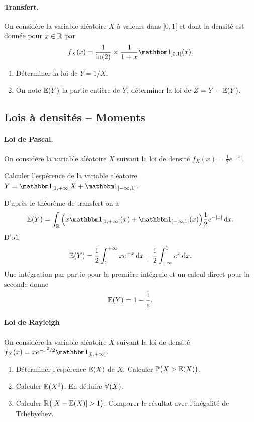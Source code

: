 \documentclass[11pt, a4paper]{article}
\begin{document}
\paragraph{Transfert.} On considère la variable aléatoire $X$ à valeurs
dans $]0, 1[$ et dont la densité est donnée pour $x \in \mathbb{R}$ par
\[
f_X(x) = \frac{1}{\ln(2)}\times \frac{1}{1+x}\bOne_{]0, 1[}(x).
\]
\begin{question}
  \begin{enumerate}
  \item
    Déterminer la loi de $Y = 1/X$.
  \item
    On note $\mathbb{E}(Y)$ la partie entière de $Y$, déterminer la loi de
    $Z = Y - \mathbb{E}(Y)$.
  \end{enumerate}
\end{question}

\subsection{Lois à densités -- Moments}

\paragraph{Loi de Pascal.}
On considère la variable aléatoire $X$ suivant la loi de densité
$f_X(x) =  \frac{1}{2}e^{-|x|}$.
\begin{question}
  Calculer l'espérence de la variable aléatoire
  $Y = \bOne_{[1, +\infty[}X + \bOne_{[-\infty, 1]}$.
\end{question}

\begin{solution}
  D'après le théorème de transfert on a
  \[
  \mbb{E}(Y) = \int_\R \Big(x\bOne_{[1, +\infty[}(x) + \bOne_{[-\infty, 1]}(x)\Big)\frac{1}{2}e^{-|x|}\dd{x}.
  \]
  D'où
  \[
  \mathbb{E}(Y) = \frac{1}{2}\int_1^{+\infty}xe^{-x}\operatorname{d\!}{x} + \frac{1}{2} \int_{-\infty}^1 e^{x}\operatorname{d\!}{x}.
  \]
  Une intégration par partie pour la première intégrale et un calcul
  direct pour la seconde donne
  \[
   \mathbb{E}(Y) = 1 - \frac{1}{e}.
  \]
\end{solution}

\paragraph{Loi de Rayleigh}
On considère la variable aléatoire $X$ suivant la loi de densité
$f_X(x) = xe^{-x^2/2}\bOne_{[0, +\infty[}$.
\begin{question}
  \begin{enumerate}
  \item Déterminer l'espérence $\mathbb{E}(X)$ de $X$. Calculer
    $\mathbb{P}\big(X > \mathbb{E}(X)\big)$.
  \item Calculer $\mathbb{E}(X^2)$. En déduire $\mathbb{V}(X)$.
  \item Calculer $\mathbb{R}\big(|X-\mathbb{E}(X)| > 1\big)$. Comparer le
    résultat avec l'inégalité de Tchebychev.
  \end{enumerate}
\end{question}
\end{document}
